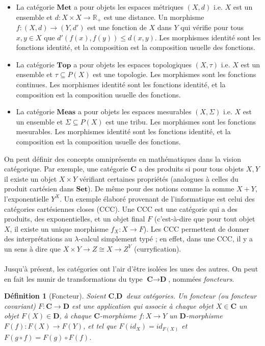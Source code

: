 \documentclass[11pt,a4paper]{report}
\newtheorem{defi}[theo]{Définition}
\newcommand{\gr}{\textbf}
\newcommand{\il}{\textit}
\newcommand{\1}{\mathbbm{1}}
\begin{document}
\begin{itemize}
\item La catégorie $\gr{Met}$ a pour objets les espaces métriques $(X,d)$ i.e. $X$ est un ensemble et $d : X \times X \to \mathbb{R}_+$ est une distance. Un morphisme $f : (X,d) \to (Y,d')$ est une fonction de $X$ dans $Y$ qui vérifie pour tous $x,y \in X$ que $d'(f(x),f(y)) \leq d(x,y)$. Les morphismes identité sont les fonctions identité, et la composition est la composition usuelle des fonctions.
\item La catégorie $\gr{Top}$ a pour objets les espaces topologiques $(X,\tau)$ i.e. $X$ est un ensemble et $\tau \subseteq P(X)$ est une topologie. Les morphismes sont les fonctions continues. Les morphismes identité sont les fonctions identité, et la composition est la composition usuelle des fonctions.
\item La catégorie $\gr{Meas}$ a pour objets les espaces mesurables $(X,\Sigma)$ i.e. $X$ est un ensemble et $\Sigma \subseteq P(X)$ est une tribu. Les morphismes sont les fonctions mesurables. Les morphismes identité sont les fonctions identité, et la composition est la composition usuelle des fonctions.
\end{itemize}
On peut définir des concepts omniprésents en mathématiques dans la vision catégorique. Par exemple, une catégorie $\gr{C}$ a des produits si pour tous objets $X,Y$ il existe un objet $X \times Y$ vérifiant certaines propriétés (analogues à celles du produit cartésien dans $\gr{Set}$). De même pour des notions comme la somme $X + Y$, l'exponentielle $Y^X$. Un exemple élaboré provenant de l'informatique est celui des catégories cartésiennes closes (CCC). Une CCC est une catégorie qui a des produits, des exponentielles, et un objet final $F$ (c'est-à-dire que pour tout objet $X$, il existe un unique morphisme $f_X : X \to F$). Les CCC permettent de donner des interprétations au $\lambda$-calcul simplement typé ; en effet, dans une CCC, il y a un sens à dire que $X \times Y \to Z \cong X \to Z^Y$ (curryfication).\\\\
Jusqu'à présent, les catégories ont l'air d'être isolées les unes des autres. On peut en fait les munir de transformations du type $\gr{C} \to \gr{D}$, nommées \il{foncteurs}.
\begin{defi}[Foncteur]
Soient $\gr{C},\gr{D}$ deux catégories. Un foncteur (ou foncteur covariant) $F : \gr{C} \to \gr{D}$ est une application qui associe à chaque objet $X \in \gr{C}$ un objet $F(X) \in \gr{D}$, à chaque $\gr{C}$-morphisme $f : X \to Y$ un $\gr{D}$-morphisme $F(f) : F(X) \to F(Y)$, et tel que $F(id_X) = id_{F(X)}$ et $F(g \circ f) = F(g) \circ F(f)$. 
\end{defi}
\end{document}
